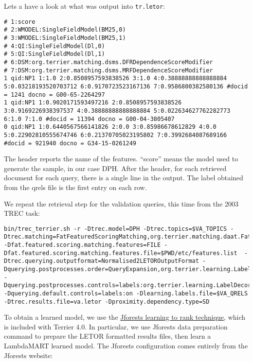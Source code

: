 Lets a have a look at what was output into \texttt{tr.letor}:

\begin{verbatim}
# 1:score
# 2:WMODEL:SingleFieldModel(BM25,0)
# 3:WMODEL:SingleFieldModel(BM25,1)
# 4:QI:SingleFieldModel(Dl,0)
# 5:QI:SingleFieldModel(Dl,1)
# 6:DSM:org.terrier.matching.dsms.DFRDependenceScoreModifier
# 7:DSM:org.terrier.matching.dsms.MRFDependenceScoreModifier
1 qid:NP1 1:1.0 2:0.8508957593838526 3:1.0 4:0.38888888888888884 5:0.03218193520703712 6:0.9170723523167136 7:0.9586800382580136 #docid = 1241 docno = G00-65-2264297
1 qid:NP1 1:0.9020171593497216 2:0.8508957593838526 3:0.9169226938397537 4:0.38888888888888884 5:0.022634627762282773 6:1.0 7:1.0 #docid = 11394 docno = G00-04-3805407
0 qid:NP1 1:0.6440567566141826 2:0.0 3:0.85986678612829 4:0.0 5:0.22902810555674746 6:0.21370705023195802 7:0.3992684087689166 #docid = 921940 docno = G34-15-0261249
\end{verbatim}

The header reports the name of the features. ``score'' means the model
used to generate the sample, in our case DPH. After the header, for each
retrieved document for each query, there is a single line in the output.
The label obtained from the qrels file is the first entry on each row.

We repeat the retrieval step for the validation queries, this time from
the 2003 TREC task:

\begin{verbatim}
bin/trec_terrier.sh -r -Dtrec.model=DPH -Dtrec.topics=$VA_TOPICS -Dtrec.matching=FatFeaturedScoringMatching,org.terrier.matching.daat.FatFull -Dfat.featured.scoring.matching.features=FILE -Dfat.featured.scoring.matching.features.file=$PWD/etc/features.list  -Dtrec.querying.outputformat=Normalised2LETOROutputFormat -Dquerying.postprocesses.order=QueryExpansion,org.terrier.learning.LabelDecorator -Dquerying.postprocesses.controls=labels:org.terrier.learning.LabelDecorator,qe:QueryExpansion -Dquerying.default.controls=labels:on -Dlearning.labels.file=$VA_QRELS -Dtrec.results.file=va.letor -Dproximity.dependency.type=SD
\end{verbatim}

To obtain a learned model, we use the
\href{https://code.google.com/p/jforests/}{Jforests learning to rank
technique}, which is included with Terrier 4.0. In particular, we use
Jforests data preparation command to prepare the LETOR formatted results
files, then learn a LambdaMART learned model. The Jforests configuration
comes entirely from the Jforests website:

